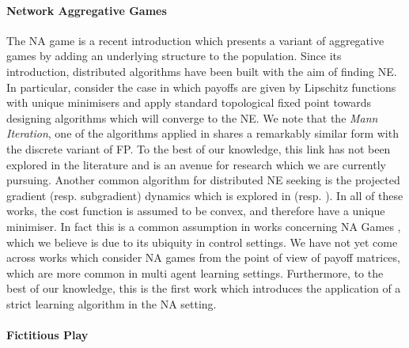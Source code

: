 \documentclass{article}
\theoremstyle{definition}
\begin{document}
\paragraph{Network Aggregative Games}

The NA game is a recent introduction \cite{Parise2015} which presents a variant of aggregative games
by adding an underlying structure to the population. Since its introduction, distributed algorithms
have been built with the aim of finding NE. In particular, \cite{Parise2015, Parise2020} consider
the case in which payoffs are given by Lipschitz functions with unique minimisers and apply standard
topological fixed point towards designing algorithms which will converge to the NE. We note that the
\emph{Mann Iteration}, one of the algorithms applied in \cite{Parise2020} shares a remarkably
similar form with the discrete variant of FP. To the best of our knowledge, this link has not been
explored in the literature and is an avenue for research which we are currently pursuing. Another
common algorithm for distributed NE seeking is the projected gradient (resp. subgradient) dynamics
which is explored in \cite{Zhang2020} (resp. \cite{Shokri2020, Shokri2021}). In all of these works,
the cost function is assumed to be convex, and therefore have a unique minimiser. In fact this is a
common assumption in works concerning NA Games \cite{Zhu2021, Lei2020}, which we believe is due to
its ubiquity in control settings. We have not yet come across works which consider NA games from the
point of view of payoff matrices, which are more common in multi agent learning settings.
Furthermore, to the best of our knowledge, this is the first work which introduces the application
of a strict learning algorithm in the NA setting.

\paragraph{Fictitious Play}
\end{document}
